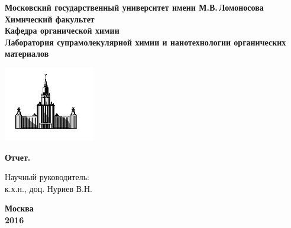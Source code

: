 \documentclass[a4paper]{article}
\begin{document}
\begin{titlepage}
\centering
\textbf{\large Московский государственный университет имени М.В.\,Ломоносова\\
\vspace*{0.1cm} Химический факультет\\
\vspace*{0.1cm}
\noindent\makebox[\linewidth]{\rule{\paperwidth}{0.4pt}}
\vspace*{0.1cm}
 Кафедра органической химии\\
\vspace*{0.1cm} Лаборатория супрамолекулярной химии и нанотехнологии органических материалов \\}
\vspace*{2cm}

\begin{center}
\includegraphics[width=0.3\textwidth]{pictures/logo.jpg}
\end{center}

\vspace*{2cm}
\Large \textbf{Отчет.}
\vspace*{2cm}

\begin{flushright}
Научный руководитель:\\
к.х.н., доц. Нуриев В.Н.
\end{flushright}
\vfill
\large\textbf{Москва\\ 2016}
\end{titlepage}

\tableofcontents
\end{document}
